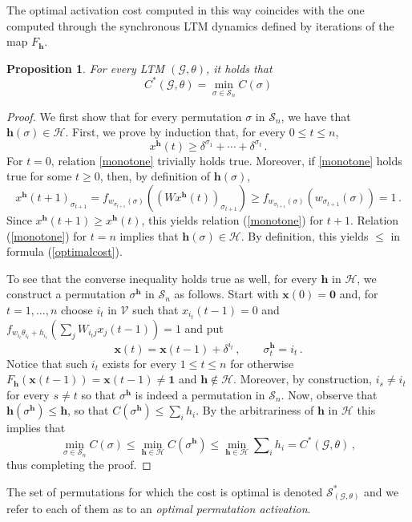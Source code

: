 \documentclass[12pt,twoside,reqno]{amsart}
\newtheorem{proposition}[theorem]{Proposition}
\theoremstyle{definition}
\numberwithin{equation}{section}
\newcommand{\be}{\begin{equation}}
\newcommand{\ee}{\end{equation}}
\newcommand{\mc}{\mathcal}
\newcommand{\0}{\mathbf{0}}
\newcommand{\1}{\mathbf{1}}
\newcommand{\x}{\mathbf{x}}
\renewcommand{\S}{\mathcal{S} }
\newcommand{\R}{\mathbb{R}}
\newcommand{\infl}{h}
\newcommand{\Infl}{\mathbf{\infl}}
\newcommand{\threabs}{\theta}
\begin{document}
The optimal activation cost computed in this way coincides with the one computed through the synchronous LTM dynamics defined by iterations of the map $F_{\Infl}$. 
\begin{proposition}\label{prop:optimal-cost} For every LTM $(\mc G,\theta)$, it holds that 
\be\label{optimalcost}
C^*(\mc G,\threabs)=\min\limits_{\sigma\in \S_{n}}C({\sigma})
\ee
\end{proposition}
\begin{proof}

We first show that for every permutation $\sigma$ in $\mc S_{n}$, we have that $\Infl(\sigma)\in\mc H$. First, we prove by induction that, for every $0\le t\leq n$, 
\be\label{monotone}x^{\Infl}(t)\geq \delta^{\sigma_1}+\cdots +  \delta^{\sigma_t}\,.\ee
For $t=0$, relation \eqref{monotone} trivially holds true. Moreover, if \eqref{monotone} holds true for some $t\ge0$, then, by definition of $\Infl(\sigma)$,
$$x^{\Infl}(t+1)_{\sigma_{t+1}}=f_{w_{\sigma_{t+1}}(\sigma)}((Wx^{\Infl}(t))_{\sigma_{t+1}})\geq f_{w_{\sigma_{t+1}}(\sigma)}(w_{\sigma_{t+1}}(\sigma))=1\,. $$
Since $x^{\Infl}(t+1)\geq x^{\Infl}(t)$, this yields relation (\ref{monotone}) for $t+1$. Relation (\ref{monotone}) for $t=n$  implies that $\Infl(\sigma)\in\mc H$. By definition, this yields $\leq$ in formula (\ref{optimalcost}).

To see that the converse inequality holds true as well, for every $\Infl$ in $\mc H$, we construct a permutation $\sigma^\Infl$ in $\mc S_n$ as follows. Start with $\x(0)=\0$ and, for $t=1,\ldots,n$ choose $i_t$ in $\mc V$ such that $x_{i_t}(t-1)=0$ and $f_{w_{i_t}\theta_{i_t}+h_{i_t}}(\sum_jW_{{i_t}j}x_j(t-1))=1$ and put $$\x(t)=\x(t-1)+\delta^{i_t}\,,\qquad \sigma^{\Infl}_t={i_t}\,.$$ 
Notice that such ${i_t}$ exists for every $1\le t\le n$ for otherwise $F_{\Infl}(\x(t-1))=\x(t-1)\ne\1$ and $\Infl\notin\mc H$. Moreover, by construction, $i_s\ne i_t$ for every $s\ne t$ so that $\sigma^{\Infl}$ is indeed a permutation in $\mc S_n$. Now, observe that $\Infl(\sigma^{\Infl})\le \Infl$, so that $C(\sigma^{\Infl})\le\sum_ih_i$. By the arbitrariness of $\Infl$ in $\mc H$ this implies that 
$$\min\limits_{\sigma\in \S_{n}}C({\sigma})\le\min\limits_{\Infl\in\mc H}C({\sigma}^{\Infl})\le\min\limits_{\Infl\in\mc H}\sum\nolimits_ih_i= C^*(\mc G,\threabs)\,,$$
thus completing the proof. 
\end{proof}
The set of permutations for which the cost is optimal is denoted $\mathcal S_{(\mc G, \threabs)}^*$ and we refer to each of them as to an \emph{optimal permutation activation}. 
\end{document}
